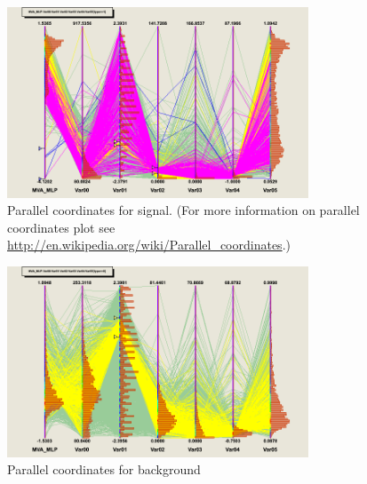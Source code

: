 \begin{figure}[!h]
\begin{center}
\includegraphics[width=0.8\textwidth]{images/ahParacoor_c0_S.png}
\caption{Parallel coordinates for signal. 
(For more information on parallel coordinates plot see \url{http://en.wikipedia.org/wiki/Parallel_coordinates}.)}
\label{fig:ahParacoor_c0_S}
\end{center}
\end{figure}
\begin{figure}[!h]
\begin{center}
\includegraphics[width=0.8\textwidth]{images/ahParacoor_c0_B.png}
\caption{Parallel coordinates for background}
\label{fig:ahParacoor_c0_B}
\end{center}
\end{figure}

\clearpage

